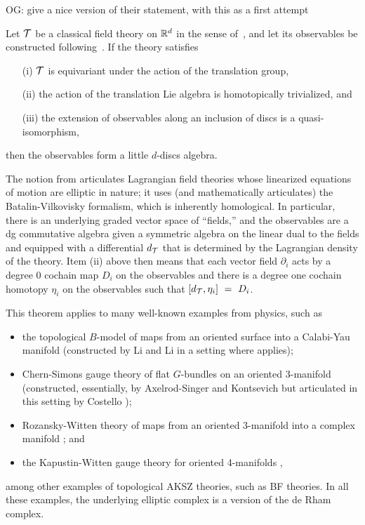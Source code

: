\documentclass[11pt]{amsart}
\def\owen#1{{\textcolor{violet!65!black}{OG: {#1}}}}
\begin{document}
\owen{give a nice version of their statement, with this as a first attempt}

\begin{thm}[\cite{EllSaf},\owen{precise location}]
Let $\mathcal T$ be a classical field theory on $\mathbb R^d$ in the sense of~\cite{CosBook},
and let its observables be constructed following~\cite{CG2}.
If the theory satisfies 
\begin{enumerate}
\item[(i)] $\mathcal T$ is equivariant under the action of the translation group,
\item[(ii)] the action of the translation Lie algebra is homotopically trivialized, and
\item[(iii)] the extension of observables along an inclusion of discs is a quasi-isomorphism,
\end{enumerate}
then the observables form a little $d$-discs algebra.
\end{thm}

The notion from \cite{CosBook} articulates Lagrangian field theories whose linearized equations of motion are elliptic in nature;
it uses (and mathematically articulates) the Batalin-Vilkovisky formalism,
which is inherently homological.
In particular, there is an underlying graded vector space of ``fields,''
and the observables are a dg commutative algebra given a symmetric algebra on the linear dual to the fields and equipped with a differential $d_\mathcal T$ that is determined by the Lagrangian density of the theory.
Item (ii) above then means that each vector field $\partial_i$ acts by a degree 0 cochain map $D_i$ on the observables and there is a degree one cochain homotopy $\eta_i$ on the observables such that $[d_\mathcal T, \eta_i]~=~D_i$.

This theorem applies to many well-known examples from physics, such as 
\begin{itemize}
\item the topological $B$-model of maps from an oriented surface into a Calabi-Yau manifold (constructed by Li and Li \cite{LiLi} in a setting where \cite{EllSaf} applies);
\item Chern-Simons gauge theory of flat $G$-bundles on an oriented 3-manifold (constructed, essentially, by Axelrod-Singer \cite{AxeSin} and Kontsevich \cite{KonECM} but articulated in this setting by Costello \cite{CosBook});
\item Rozansky-Witten theory of maps from an oriented 3-manifold into a complex manifold \cite{ChanLeungLi}; and
\item the Kapustin-Witten gauge theory for oriented 4-manifolds \cite{EGW},
\end{itemize}
among other examples of topological AKSZ theories, such as BF theories.
In all these examples, the underlying elliptic complex is a version of the de Rham complex.
\end{document}
